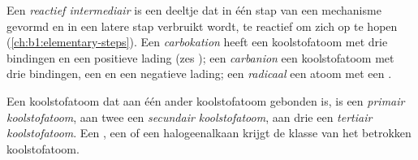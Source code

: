 \begin{definition}\label{def:b1:electronic-effects:intermediates}
Een \emph{reactief intermediair} is een
deeltje dat in één stap van een mechanisme gevormd en in een latere stap
verbruikt wordt, te reactief om zich op te hopen
(\cref{ch:b1:elementary-steps}). Een
\emph{carbokation} heeft een koolstofatoom met drie
bindingen en een positieve lading (zes ); een
\emph{carbanion} een koolstofatoom met drie bindingen,
een  en een negatieve lading; een
\emph{radicaal} een atoom met een .
\end{definition}

\begin{definition}\label{def:b1:electronic-effects:carbon-class}
Een koolstofatoom dat aan één ander koolstofatoom gebonden is, is een
\emph{primair koolstofatoom}, aan twee een
\emph{secundair koolstofatoom}, aan drie
een \emph{tertiair koolstofatoom}. Een
, een  of een halogeenalkaan krijgt de klasse van het
betrokken koolstofatoom.
\end{definition}

